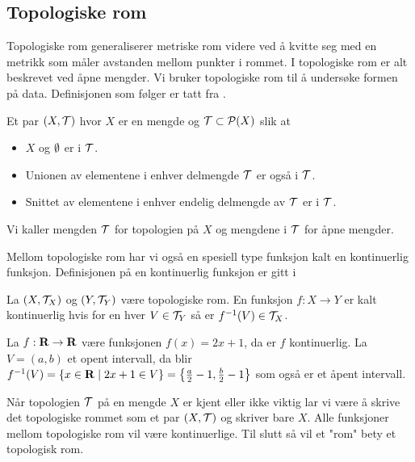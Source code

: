 \subsection{Topologiske rom}\label{Sek:TopRom}
Topologiske rom generaliserer metriske rom videre ved
å kvitte seg med en metrikk som måler avstanden mellom
punkter i rommet. I topologiske rom er alt beskrevet ved
åpne mengder. Vi bruker topologiske rom til å undersøke
formen på data. Definisjonen som følger er tatt fra
\citep[seksjon 12]{Munkres2013}. 

\begin{definisjon}\label{Def:TopRom}
    Et par $(X,\mathcal{T})$ hvor $X$ er en mengde og
    $\mathcal{T}\subset\mathcal{P}(X)$ slik at 
    \begin{itemize}
        \item $X$ og $\emptyset$ er i $\mathcal{T}$.
        \item Unionen av elementene i enhver delmengde
          $\mathcal{T}$ er også i $\mathcal{T}$.
        \item Snittet av elementene i enhver endelig
          delmengde av $\mathcal{T}$ er i $\mathcal{T}$.
    \end{itemize}
    Vi kaller mengden $\mathcal{T}$ for topologien på $X$ og
    mengdene i $\mathcal{T}$ for åpne mengder.
\end{definisjon}

Mellom topologiske rom har vi også en spesiell type
funksjon kalt en kontinuerlig funksjon. Definisjonen på en
kontinuerlig funksjon er gitt i \citep[seksjon 18]{Munkres2013}

\begin{definisjon}\label{Def:KontFunk}
    La $(X,\mathcal{T}_X)$ og $(Y,\mathcal{T}_Y)$ være topologiske
    rom. En funksjon $f: X\to Y$ er kalt kontinuerlig hvis
    for en hver \(V\in\mathcal{T}_Y\) så er
    \(f^{-1}(V)\in\mathcal{T}_X\).
\end{definisjon}

\begin{eksempel}\label{Ex:KontFunk}
    La $f: \textnormal{\textbf{{R}}}\to \textnormal{\textbf{{R}}}$ være funksjonen $f(x)=2x+1$, da
    er $f$ kontinuerlig. La $V = (a,b)$ et opent
    intervall, da blir $f^{-1}(V)
    = \{x\in\textnormal{\textbf{{R}}}\;|\;2x+1\in
    V\}=\left\{\frac{a}{2}-1,\frac{b}{2}-1\right\}$ som også er et
    åpent intervall.
\end{eksempel}

Når topologien $\mathcal{T}$ på en mengde $X$ er kjent eller
ikke viktig lar vi være å skrive det topologiske rommet
som et par $(X,\mathcal{T})$ og skriver bare $X$. Alle
funksjoner mellom topologiske rom vil være kontinuerlige.
Til slutt så vil et "rom" bety et topologisk rom.


